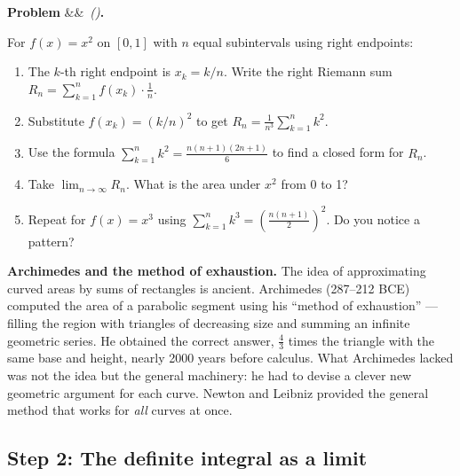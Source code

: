 \documentclass[12pt, a4paper]{article}
\newcounter{problem}
\newenvironment{problem}[1][]{%
  \refstepcounter{problem}%
  \par\vspace{6pt}%
  \noindent\textbf{\color{MidBlue}Problem \theproblem}%
  \ifx&#1&\else\ \textit{(#1)}\fi\textbf{.}\enskip
}{\par\vspace{4pt}}
\begin{document}
\begin{problem}
\label{prob:riemann_limit}
For $f(x) = x^2$ on $[0,1]$ with $n$ equal subintervals using right endpoints:
\begin{enumerate}[label=(\alph*), topsep=2pt]
  \item The $k$-th right endpoint is $x_k = k/n$. Write the right Riemann sum $R_n = \sum_{k=1}^{n} f(x_k) \cdot \frac{1}{n}$.
  \item Substitute $f(x_k) = (k/n)^2$ to get $R_n = \frac{1}{n^3}\sum_{k=1}^{n} k^2$.
  \item Use the formula $\sum_{k=1}^{n} k^2 = \frac{n(n+1)(2n+1)}{6}$ to find a closed form for $R_n$.
  \item Take $\lim_{n\to\infty} R_n$. What is the area under $x^2$ from 0 to 1?
  \item Repeat for $f(x) = x^3$ using $\sum_{k=1}^n k^3 = \left(\frac{n(n+1)}{2}\right)^2$. Do you notice a pattern?
\end{enumerate}
\end{problem}

\begin{thought}
\textbf{Archimedes and the method of exhaustion.}
The idea of approximating curved areas by sums of rectangles is ancient. Archimedes (287--212 BCE) computed the area of a parabolic segment using his ``method of exhaustion'' --- filling the region with triangles of decreasing size and summing an infinite geometric series. He obtained the correct answer, $\frac{4}{3}$ times the triangle with the same base and height, nearly 2000 years before calculus. What Archimedes lacked was not the idea but the general machinery: he had to devise a clever new geometric argument for each curve. Newton and Leibniz provided the general method that works for \emph{all} curves at once.
\end{thought}

\subsection{Step 2: The definite integral as a limit}
\end{document}
